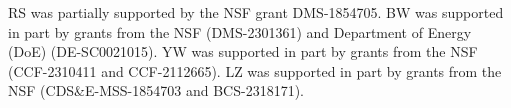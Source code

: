 \documentclass{amsart}
\begin{document}
RS was partially supported by the NSF grant DMS-1854705.  BW was supported in part by grants from the NSF (DMS-2301361) and Department of Energy (DoE) (DE-SC0021015). YW was supported in part by grants from the NSF (CCF-2310411 and CCF-2112665). LZ was supported in part by grants from the NSF (CDS\&E-MSS-1854703 and BCS-2318171).



\end{document}
